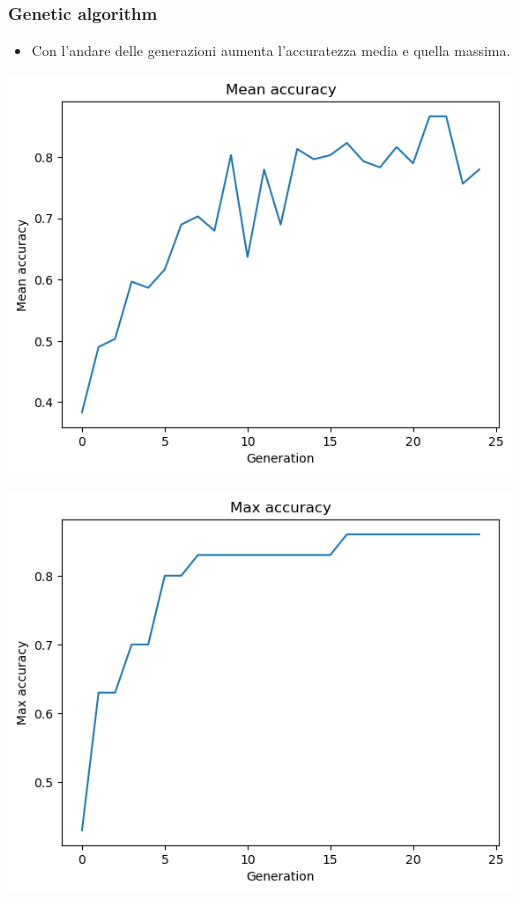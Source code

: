 \documentclass{beamer}
\begin{document}
\begin{frame}
  \frametitle{Genetic algorithm}
  \begin{itemize}
    \item Con l'andare delle generazioni aumenta l'accuratezza media e quella massima.
  \end{itemize}
  \vspace{0.8cm}

  \begin{minipage}{0.5\textwidth}
    \centering
    \includegraphics[width=\textwidth]{images/meanaccuracy.png}
\end{minipage}%
\begin{minipage}{0.5\textwidth}
    \centering
    \includegraphics[width=\textwidth]{images/maxaccuracy.png}
\end{minipage}
\end{frame}
\end{document}
